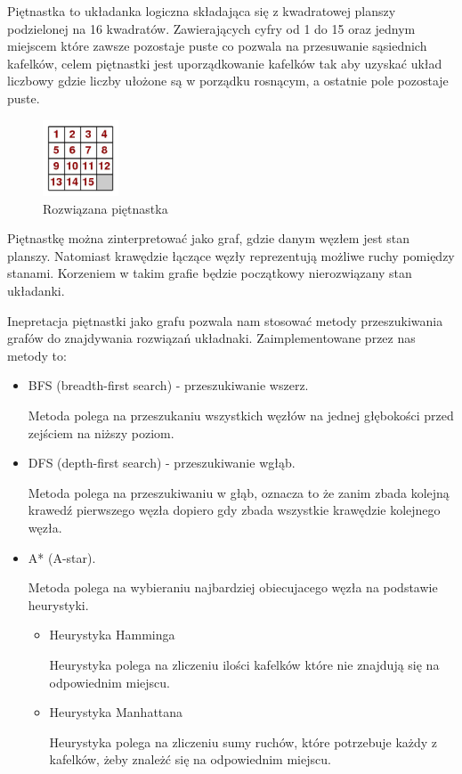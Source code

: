 \documentclass{classrep}
\begin{document}
    {

     Piętnastka to układanka logiczna składająca się z kwadratowej
        planszy podzielonej na 16 kwadratów. Zawierających cyfry od 1 do 15 oraz jednym miejscem które zawsze pozostaje puste
        co pozwala na przesuwanie sąsiednich kafelków, celem piętnastki jest uporządkowanie kafelków tak aby uzyskać układ liczbowy
        gdzie liczby ułożone są w porządku rosnącym, a ostatnie pole pozostaje puste.
        \begin{figure}[!ht]
            \centering
            \includegraphics[width=0.2\textwidth,keepaspectratio]
            {15}
            \caption{Rozwiązana piętnastka}
            \label{fig:Rozwiązana piętnastka}
        \end{figure}



        Piętnastkę można zinterpretować jako graf, gdzie danym węzłem jest stan planszy. Natomiast krawędzie łączące węzły
    reprezentują możliwe ruchy pomiędzy stanami. Korzeniem w takim grafie będzie początkowy nierozwiązany stan układanki.

    Inepretacja piętnastki jako grafu pozwala nam stosować metody przeszukiwania grafów do znajdywania rozwiązań układnaki.
    Zaimplementowane przez nas metody to:
        \begin{itemize}
            \item BFS (breadth-first search) - przeszukiwanie wszerz.

            Metoda polega na przeszukaniu wszystkich węzłów na jednej głębokości przed zejściem na niższy poziom.
            \item DFS (depth-first search) - przeszukiwanie wgłąb.

            Metoda polega na przeszukiwaniu w głąb, oznacza to że zanim zbada kolejną krawedź pierwszego węzła
            dopiero gdy zbada wszystkie krawędzie kolejnego węzła.
            \item A* (A-star).

            Metoda polega na wybieraniu najbardziej obiecujacego węzła na podstawie heurystyki.
            \begin{itemize}
                \item Heurystyka Hamminga

                Heurystyka polega na zliczeniu ilości kafelków które nie znajdują się na odpowiednim miejscu.
                \item Heurystyka Manhattana

                Heurystyka polega na zliczeniu sumy ruchów, które potrzebuje każdy z kafelków, żeby znależć się na odpowiednim miejscu.
            \end{itemize}
        \end{itemize}

    }\label{sec:wprowadzenie}
\end{document}
